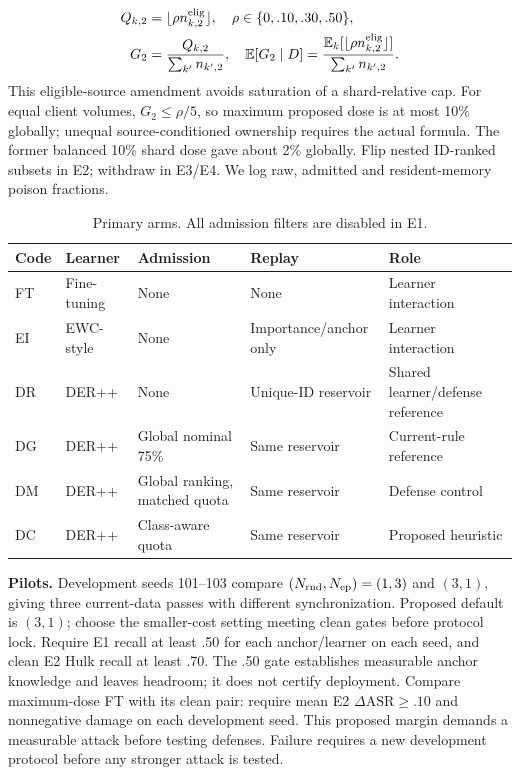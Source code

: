 \documentclass[10pt,a4paper]{article}
\begin{document}
\begin{equation}
\begin{aligned}
Q_{k,2}&=\lfloor\rho n^{\rm elig}_{k,2}\rfloor,\quad \rho\in\{0,.10,.30,.50\},\\
G_2&=\frac{Q_{k,2}}{\sum_{k'} n_{k',2}},\quad
\mathbb E[G_2\mid D]=\frac{\mathbb E_k[\lfloor\rho n^{\rm elig}_{k,2}\rfloor]}{\sum_{k'} n_{k',2}}.
\end{aligned}
\label{eq:dose}
\end{equation}
This eligible-source amendment avoids saturation of a shard-relative cap. For equal client volumes, $G_2\le\rho/5$, so maximum proposed dose is at most 10\% globally; unequal source-conditioned ownership requires the actual formula. The former balanced 10\% shard dose gave about 2\% globally. Flip nested ID-ranked subsets in E2; withdraw in E3/E4. We log raw, admitted and resident-memory poison fractions.

\begin{table}[htbp]
\centering\footnotesize
\caption{Primary arms. All admission filters are disabled in E1.}
\label{tab:arms}
\begin{tabularx}{\linewidth}{L{1.0cm}L{1.2cm}Y Y Y}
\toprule
Code & Learner & Admission & Replay & Role\\
\midrule
FT & Fine-tuning & None & None & Learner interaction\\
EI & EWC-style & None & Importance/anchor only & Learner interaction\\
DR & DER++ & None & Unique-ID reservoir & Shared learner/defense reference\\
DG & DER++ & Global nominal 75\% & Same reservoir & Current-rule reference\\
DM & DER++ & Global ranking, matched quota & Same reservoir & Defense control\\
DC & DER++ & Class-aware quota & Same reservoir & Proposed heuristic\\
\bottomrule
\end{tabularx}
\end{table}

\textbf{Pilots.} Development seeds 101--103 compare $(N_{\rm rnd},N_{\rm ep})=(1,3)$ and $(3,1)$, giving three current-data passes with different synchronization. Proposed default is $(3,1)$; choose the smaller-cost setting meeting clean gates before protocol lock. Require E1 recall at least .50 for each anchor/learner on each seed, and clean E2 Hulk recall at least .70. The .50 gate establishes measurable anchor knowledge and leaves headroom; it does not certify deployment. Compare maximum-dose FT with its clean pair: require mean E2 $\Delta\mathrm{ASR}\ge.10$ and nonnegative damage on each development seed. This proposed margin demands a measurable attack before testing defenses. Failure requires a new development protocol before any stronger attack is tested.
\end{document}
